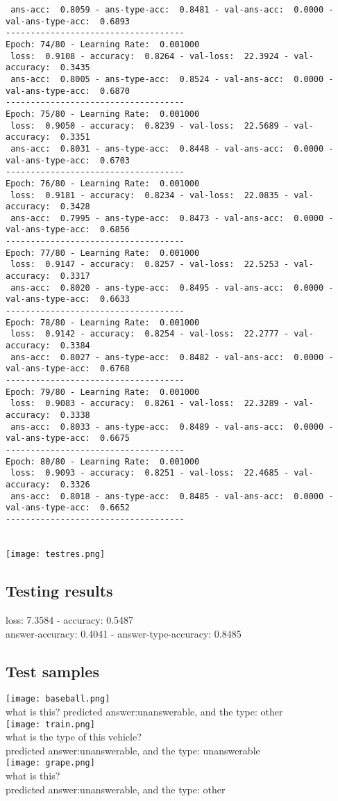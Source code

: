 \documentclass{report}
\begin{document}
\begin{verbatim}
 ans-acc:  0.8059 - ans-type-acc:  0.8481 - val-ans-acc:  0.0000 - val-ans-type-acc:  0.6893
------------------------------------
Epoch: 74/80 - Learning Rate:  0.001000
 loss:  0.9108 - accuracy:  0.8264 - val-loss:  22.3924 - val-accuracy:  0.3435
 ans-acc:  0.8005 - ans-type-acc:  0.8524 - val-ans-acc:  0.0000 - val-ans-type-acc:  0.6870
------------------------------------
Epoch: 75/80 - Learning Rate:  0.001000
 loss:  0.9050 - accuracy:  0.8239 - val-loss:  22.5689 - val-accuracy:  0.3351
 ans-acc:  0.8031 - ans-type-acc:  0.8448 - val-ans-acc:  0.0000 - val-ans-type-acc:  0.6703
------------------------------------
Epoch: 76/80 - Learning Rate:  0.001000
 loss:  0.9181 - accuracy:  0.8234 - val-loss:  22.0835 - val-accuracy:  0.3428
 ans-acc:  0.7995 - ans-type-acc:  0.8473 - val-ans-acc:  0.0000 - val-ans-type-acc:  0.6856
------------------------------------
Epoch: 77/80 - Learning Rate:  0.001000
 loss:  0.9147 - accuracy:  0.8257 - val-loss:  22.5253 - val-accuracy:  0.3317
 ans-acc:  0.8020 - ans-type-acc:  0.8495 - val-ans-acc:  0.0000 - val-ans-type-acc:  0.6633
------------------------------------
Epoch: 78/80 - Learning Rate:  0.001000
 loss:  0.9142 - accuracy:  0.8254 - val-loss:  22.2777 - val-accuracy:  0.3384
 ans-acc:  0.8027 - ans-type-acc:  0.8482 - val-ans-acc:  0.0000 - val-ans-type-acc:  0.6768
------------------------------------
Epoch: 79/80 - Learning Rate:  0.001000
 loss:  0.9083 - accuracy:  0.8261 - val-loss:  22.3289 - val-accuracy:  0.3338
 ans-acc:  0.8033 - ans-type-acc:  0.8489 - val-ans-acc:  0.0000 - val-ans-type-acc:  0.6675
------------------------------------
Epoch: 80/80 - Learning Rate:  0.001000
 loss:  0.9093 - accuracy:  0.8251 - val-loss:  22.4685 - val-accuracy:  0.3326
 ans-acc:  0.8018 - ans-type-acc:  0.8485 - val-ans-acc:  0.0000 - val-ans-type-acc:  0.6652
------------------------------------
\end{verbatim}\\
\texttt{[image: testres.png]}

\subsection{Testing results}
loss:  7.3584 - accuracy:  0.5487\\
answer-accuracy:  0.4041 - answer-type-accuracy:  0.8485

\subsection{Test samples}
\texttt{[image: baseball.png]}\\
what is this?
predicted answer:unanswerable, and the type: other
\\
\texttt{[image: train.png]}\\
what is the type of this vehicle?\\
predicted answer:unanswerable, and the type: unanswerable\\
\texttt{[image: grape.png]}\\
what is this?\\
predicted answer:unanswerable, and the type: other\\
\end{document}
